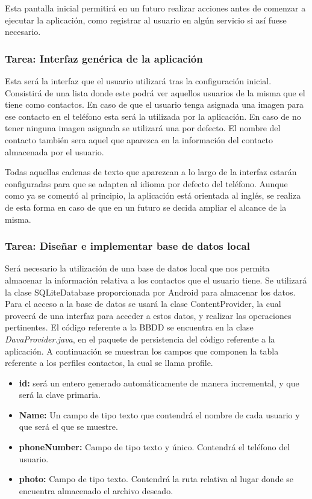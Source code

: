 Esta pantalla inicial permitirá en un futuro realizar acciones antes de comenzar a ejecutar la aplicación, como registrar al usuario en algún servicio si así fuese necesario.



\subsubsection{Tarea: Interfaz genérica de la aplicación}

Esta será la interfaz que el usuario utilizará tras la configuración inicial. Consistirá de una lista donde este podrá ver aquellos usuarios de la misma que el tiene como contactos. En caso de que el usuario tenga asignada una imagen para ese contacto en el teléfono esta será la utilizada por la aplicación. En caso de no tener ninguna imagen asignada se utilizará una por defecto. El nombre del contacto también sera aquel que aparezca en la información del contacto almacenada por el usuario.

Todas aquellas cadenas de texto que aparezcan a lo largo de la interfaz estarán configuradas para que se adapten al idioma por defecto del teléfono. Aunque como ya se comentó al principio, la aplicación está orientada al inglés, se realiza de esta forma en caso de que en un futuro se decida ampliar el alcance de la misma.



\subsubsection{Tarea: Diseñar e implementar base de datos local}

Será necesario la utilización de una base de datos local que nos permita almacenar la información relativa a los contactos que el usuario tiene. Se utilizará la clase SQLiteDatabase proporcionada por Android para almacenar los datos. Para el acceso a la base de datos se usará la clase ContentProvider, la cual proveerá de una interfaz para acceder a estos datos, y realizar las operaciones pertinentes. El código referente a la \ac{BBDD} se encuentra en la clase \textit{DavaProvider.java}, en el paquete de persistencia del código referente a la aplicación. A continuación se muestran los campos que componen la tabla referente a los perfiles contactos, la cual se llama profile.
\begin{itemize}
\item \textbf{\textunderscore id:} será un entero generado automáticamente de manera incremental, y que será la clave primaria.
\item \textbf{Name:} Un campo de tipo texto que contendrá el nombre de cada usuario y que será el que se muestre.
\item \textbf{phoneNumber:} Campo de tipo texto y único. Contendrá el teléfono del usuario.
\item \textbf{photo:} Campo de tipo texto. Contendrá la ruta relativa al lugar donde se encuentra almacenado el archivo deseado.
\end{itemize}

